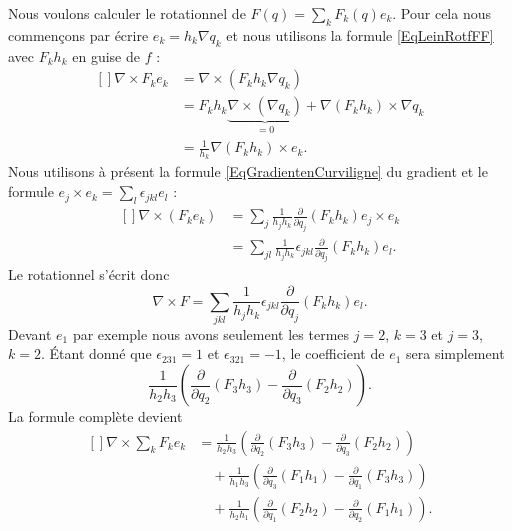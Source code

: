 Nous voulons calculer le rotationnel de $F(q)=\sum_kF_k(q)e_k$. Pour cela nous commençons par écrire $e_k=h_k\nabla q_k$ et nous utilisons la formule \eqref{EqLeinRotfFF} avec $F_kh_k$ en guise de $f$ :
\begin{equation}
    \begin{aligned}[]
        \nabla\times F_ke_k&=\nabla\times(F_kh_k\nabla q_k)\\
        &=F_kh_k\underbrace{\nabla\times(\nabla q_k)}_{=0}+\nabla(F_kh_k)\times\nabla q_k\\
        &=\frac{1}{ h_k }\nabla(F_kh_k)\times e_k.
    \end{aligned}
\end{equation}
Nous utilisons à présent la formule \eqref{EqGradientenCurviligne} du gradient et le formule $e_j\times e_k=\sum_l\epsilon_{jkl}e_l$ :
\begin{equation}
    \begin{aligned}[]
        \nabla\times(F_ke_k)&=\sum_{j}\frac{1}{ h_jh_k }\frac{ \partial  }{ \partial q_j }(F_kh_k)e_j\times e_k\\
        &=\sum_{jl}\frac{1}{ h_jh_k }\epsilon_{jkl}\frac{ \partial  }{ \partial q_j }(F_kh_k)e_l.
    \end{aligned}
\end{equation}
Le rotationnel s'écrit donc
\begin{equation}
    \nabla\times F=\sum_{jkl}\frac{1}{ h_jh_k }\epsilon_{jkl}\frac{ \partial  }{ \partial q_j }(F_kh_k)e_l.
\end{equation}
Devant $e_1$ par exemple nous avons seulement les termes $j=2$, $k=3$ et $j=3$, $k=2$. Étant donné que $\epsilon_{231}=1$ et $\epsilon_{321}=-1$, le coefficient de $e_1$ sera simplement
\begin{equation}
    \frac{1}{ h_2h_3 }\left( \frac{ \partial  }{ \partial q_2 }(F_3h_3)-\frac{ \partial  }{ \partial q_3 }(F_2h_2) \right).
\end{equation}
La formule complète devient
\begin{equation}
    \begin{aligned}[]
        \nabla\times\sum_k F_ke_k&=\frac{1}{ h_2h_3 }\left( \frac{ \partial  }{ \partial q_2 }(F_3h_3)-\frac{ \partial  }{ \partial q_3 }(F_2h_2) \right)\\
            &\quad+\frac{1}{ h_1h_3 }\left( \frac{ \partial  }{ \partial q_3 }(F_1h_1)-\frac{ \partial  }{ \partial q_1 }(F_3h_3) \right)\\
            &\quad+\frac{1}{ h_2h_1 }\left( \frac{ \partial  }{ \partial q_1 }(F_2h_2)-\frac{ \partial  }{ \partial q_2 }(F_1h_1) \right).  
    \end{aligned} 
\end{equation} 

